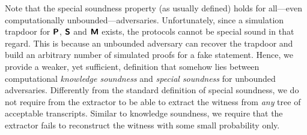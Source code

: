 \iffalse
		
	\begin{figure}[t]
		\centering
		\fbox{
		\procedure{$\genforking_{\zdv}^{m, m'} (y,h_1^{1}, \ldots, h_{q}^{1})$}		
		{
		\rho \sample \RND{\zdv}\\
		(i, s_1) \gets \zdv(y, h_1^{1}, \ldots, h_{q}^{1}; \rho)\\
    i_1 \gets i\\
		\pcfor j \in \range{2}{m'}\\
		\pcind h_{1}^{j}, \ldots, h_{i - 1}^{j} \gets h_{1}^{j - 1}, \ldots,
		h_{i - 1}^{j - 1}\\
		\pcind h_{i}^{j}, \ldots, h_{q}^{j} \sample H\\
		\pcind (i_j, s_j) \gets \zdv(y, h_1^{j}, \ldots, h_{i - 1}^{j}, h_{i}^{j},
		\ldots, h_{q}^{j}; \rho)\\
    \pcif \exists (j_1, \ldots, j_m) \in \range{1}{m'}^m, \text{ s.t. }\\
    \pcind j_k \neq j_{k'} \text{ for } k \neq k' \land \\
    \pcind i_{j_k} = i_{j_k'} \land \\
    \pcind 
		\pcelse \pcreturn (0, \bot)
	}}
\caption{Generalised forking algorithm $\genforking_{\zdv}^{m, m'}$
  \michals{5.11}{This forking lemma version is not as general as in Attema et al to
    be exact -- they allow tree of acceptable transcripts to branch at multiple
    places. however, that is not necessary in our case. Later, we should allow ``full
    generality'' but that would also require modification of the forking soundness
    definition (which now also relies on a fact that the tree branches at a single
    point)}}
	\label{fig:genforking_lemma}
\end{figure}


\fi



\iffalse
Note that the special soundness property (as usually defined) holds for
all---even computationally unbounded---adversaries. Unfortunately, since a
simulation trapdoor for $\bm{\mathsf{P}}$, $\bm{\mathsf{S}}$ and $\bm{\mathsf{M}}$ exists, the protocols
cannot be special sound in that regard. This is because an unbounded adversary
can recover the trapdoor and build an arbitrary number of simulated proofs for a fake
statement. Hence, we provide a weaker, yet sufficient, definition that somehow lies between 
computational \emph{knowledge soundness} and \emph{special soundness} for unbounded adversaries. Differently from the standard definition of special soundness, we do not require from the extractor to be able to extract the witness from \emph{any} tree of acceptable transcripts. Similar to knowledge soundness, we require that the extractor fails to reconstruct the witness with some small probability only. 

